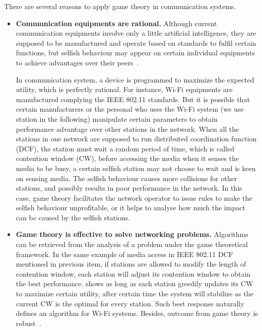 There are several reasons to apply game theory in communication systems.
\begin{itemize}
\item \textbf{Communication equipments are rational.}
Although current communication equipments involve only a little artificial intelligence, they are supposed to be manufactured and operate based on standards to fulfil certain functions, but selfish behaviour may appear on certain individual equipments to achieve advantages over their peers~\cite{game_for_communication_01}.

In communication system, a device is programmed to maximize the expected utility, which is perfectly rational.
For instance, Wi-Fi equipments are manufactured complying the IEEE 802.11 standards.
But it is possible that certain manufacturers or the personal who uses the Wi-Fi system (we use station in the following) manipulate certain parameters to obtain performance advantage over other stations in the network.
When all the stations in one network are supposed to run distributed coordination function (\gls{DCF}), \ie the station must wait a random period of time, which is called contention window (\gls{CW}), before accessing the media when it senses the media to be busy, a certain selfish station may not choose to wait and is keen on sensing media.
The selfish behaviour causes more collisions for other stations, and possibly results in poor performance in the network.
In this case, game theory facilitates the network operator to issue rules to make the selfish behaviour unprofitable, or it helps to analyse how much the impact can be caused by the selfish stations.

\item \textbf{Game theory is effective to solve networking problems.}
Algorithms can be retrieved from the analysis of a problem under the game theoretical framework.
In the same example of media access in IEEE 802.11 DCF mentioned in previous item, if stations are allowed to modify the length of contention window, each station will adjust its contention window to obtain the best performance.
\cite{contentiongame_07} shows as long as each station greedily updates its CW to maximize certain utility, after certain time the system will stabilize as the current CW is the optimal for every station.
Such best response naturally defines an algorithm for Wi-Fi systems.
%
Besides, outcome from game theory is robust~\cite{Han:2008:RAW:1457343}.




\end{itemize}
